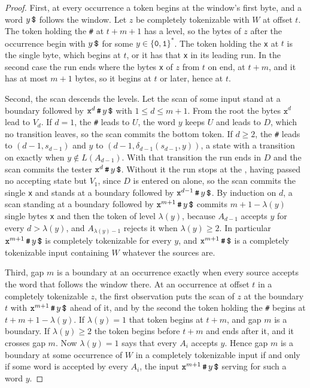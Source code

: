 \documentclass[11pt,a4paper]{article}
\theoremstyle{definition}
\theoremstyle{plain}
\newcommand{\code}[1]{\texttt{#1}}
\begin{document}
\begin{proof}
First, at every occurrence a token begins at the window's first byte, and a word $y\, \code{\symbol{36}}$ follows the
window. Let $z$ be completely tokenizable with $W$ at offset $t$. The token holding the \code{\#} at $t + m + 1$ has a
level, so the bytes of $z$ after the occurrence begin with $y\, \code{\symbol{36}}$ for some
$y \in \{\code{0}, \code{1}\}^*$. The token holding the \code{x} at $t$ is the single byte, which begins at $t$, or it
has that \code{x} in its leading run. In the second case the run ends where the bytes \code{x} of $z$ from $t$ on end,
at $t + m$, and it has at most $m + 1$ bytes, so it begins at $t$ or later, hence at $t$.

Second, the scan descends the levels. Let the scan of some input stand at a boundary followed by
$\code{x}^{d}\, \code{\#}\, y\, \code{\symbol{36}}$ with $1 \leq d \leq m + 1$. From the root the bytes $\code{x}^{d}$
lead to $V_d$. If $d = 1$, the \code{\#} leads to $U$, the word $y$ keeps $U$ and \code{} leads to $D$, which
no transition leaves, so the scan commits the bottom token. If $d \geq 2$, the \code{\#} leads to $(d - 1, s_{d-1})$ and
$y$ to $(d - 1, \delta_{d-1}(s_{d-1}, y))$, a state with a transition on \code{} exactly when
$y \notin L(A_{d-1})$. With that transition the run ends in $D$ and the scan commits the tester
$\code{x}^{d}\, \code{\#}\, y\, \code{\symbol{36}}$. Without it the run stops at the \code{}, having passed
no accepting state but $V_1$, since $D$ is entered on \code{} alone, so the scan commits the single \code{x}
and stands at a boundary followed by $\code{x}^{d-1}\, \code{\#}\, y\, \code{\symbol{36}}$. By induction on $d$, a scan
standing at a boundary followed by $\code{x}^{m+1}\, \code{\#}\, y\, \code{\symbol{36}}$ commits $m + 1 - \lambda(y)$
single bytes \code{x} and then the token of level $\lambda(y)$, because $A_{d-1}$ accepts $y$ for every
$d > \lambda(y)$, and $A_{\lambda(y) - 1}$ rejects it when $\lambda(y) \geq 2$. In particular
$\code{x}^{m+1}\, \code{\#}\, y\, \code{\symbol{36}}$ is completely tokenizable for every $y$, and
$\code{x}^{m+1}\, \code{\#}\, \code{\symbol{36}}$ is a completely tokenizable input containing $W$ whatever the sources
are.

Third, gap $m$ is a boundary at an occurrence exactly when every source accepts the word that follows the window there.
At an occurrence at offset $t$ in a completely tokenizable $z$, the first observation puts the scan of $z$ at the
boundary $t$ with $\code{x}^{m+1}\, \code{\#}\, y\, \code{\symbol{36}}$ ahead of it, and by the second the token holding
the \code{\#} begins at $t + m + 1 - \lambda(y)$. If $\lambda(y) = 1$ that token begins at $t + m$, and gap $m$ is a
boundary. If $\lambda(y) \geq 2$ the token begins before $t + m$ and ends after it, and it crosses gap $m$. Now
$\lambda(y) = 1$ says that every $A_i$ accepts $y$. Hence gap $m$ is a boundary at some occurrence of $W$ in a
completely tokenizable input if and only if some word is accepted by every $A_i$, the input
$\code{x}^{m+1}\, \code{\#}\, y\, \code{\symbol{36}}$ serving for such a word $y$.


\end{proof}
\end{document}
